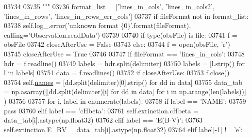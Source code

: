 \begin{DoxyCode}
03734 \textcolor{stringliteral}{}
03735 \textcolor{stringliteral}{        """}    
03736         format\_list = [\textcolor{stringliteral}{'lines\_in\_cols'}, \textcolor{stringliteral}{'lines\_in\_cols2'}, \textcolor{stringliteral}{'lines\_in\_rows'}, \textcolor{stringliteral}{'lines\_in\_rows\_err\_cols'}]
03737         \textcolor{keywordflow}{if} fileFormat \textcolor{keywordflow}{not} \textcolor{keywordflow}{in} format\_list:
03738             self.log\_.error(\textcolor{stringliteral}{'unknown format \{0\}'}.format(fileFormat), calling=\textcolor{stringliteral}{'Observation.readData'})
03739 
03740         \textcolor{keywordflow}{if} type(obsFile) \textcolor{keywordflow}{is} file:
03741             f = obsFile
03742             closeAfterUse = \textcolor{keyword}{False}
03743         \textcolor{keywordflow}{else}:
03744             f = open(obsFile, \textcolor{stringliteral}{'}\textcolor{stringliteral}{r')}
03745 \textcolor{stringliteral}{            closeAfterUse = }\textcolor{keyword}{True}
03746             
03747         \textcolor{keywordflow}{if} fileFormat == \textcolor{stringliteral}{'lines\_in\_cols'}:
03748             hdr = f.readline()
03749             labels = hdr.split(delimiter)
03750             labels = [l.strip() \textcolor{keywordflow}{for} l \textcolor{keywordflow}{in} labels]
03751             data = f.readlines()
03752             \textcolor{keywordflow}{if} closeAfterUse:
03753                 f.close()
03754             self.\hyperlink{classpyneb_1_1core_1_1pynebcore_1_1_observation_a3f365d0b1488b2eba300bf71caf23c17}{names} = [dd.split(delimiter)[0].strip() \textcolor{keywordflow}{for} dd \textcolor{keywordflow}{in} data]
03755             data\_tab = np.asarray([[dd.split(delimiter)[i] \textcolor{keywordflow}{for} dd \textcolor{keywordflow}{in} data] \textcolor{keywordflow}{for} i \textcolor{keywordflow}{in} np.arange(len(labels))]
      )
03756             
03757             \textcolor{keywordflow}{for} i, label \textcolor{keywordflow}{in} enumerate(labels):
03758                 \textcolor{keywordflow}{if} label == \textcolor{stringliteral}{'NAME'}:
03759                     \textcolor{keywordflow}{pass}
03760                 \textcolor{keywordflow}{elif} label == \textcolor{stringliteral}{'cHbeta'}:
03761                     self.extinction.cHbeta = data\_tab[i].astype(np.float32)
03762                 \textcolor{keywordflow}{elif} label == \textcolor{stringliteral}{'E(B-V)'}:
03763                     self.extinction.E\_BV = data\_tab[i].astype(np.float32)         
03764                 \textcolor{keywordflow}{elif} label[-1] != \textcolor{stringliteral}{'e'}:

\end{DoxyCode}
